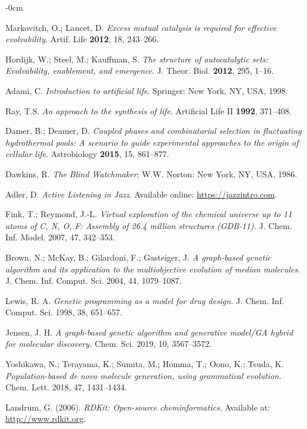 \documentclass[life,article,submit,pdftex,moreauthors]{Definitions/mdpi}
\begin{document}
\begin{adjustwidth}{-\extralength}{0cm}
{\begin{thebibliography}{999}
Markovitch, O.; Lancet, D. \textit{Excess mutual catalysis is required for effective evolvability}. Artif. Life \textbf{2012}, 18, 243--266.

Hordijk, W.; Steel, M.; Kauffman, S. \textit{The structure of autocatalytic sets: Evolvability, enablement, and emergence}. J. Theor. Biol. \textbf{2012}, 295, 1--16.

Adami, C. \textit{Introduction to artificial life}. Springer: New York, NY, USA, 1998.

Ray, T.S. \textit{An approach to the synthesis of life}. Artificial Life II \textbf{1992}, 371--408.

Damer, B.; Deamer, D. \textit{Coupled phases and combinatorial selection in fluctuating hydrothermal pools: A scenario to guide experimental approaches to the origin of cellular life}. Astrobiology \textbf{2015}, 15, 861--877.


Dawkins, R. \textit{The Blind Watchmaker}; W.W. Norton: New York, NY, USA, 1986.

Adler, D. \textit{Active Listening in Jazz}. Available online: \url{https://jazzintro.com}.

Fink, T.; Reymond, J.-L.
\textit{Virtual exploration of the chemical universe up to 11 atoms of C, N, O, F:
Assembly of 26.4 million structures (GDB-11).}
J. Chem. Inf. Model. 2007, 47, 342--353.

Brown, N.; McKay, B.; Gilardoni, F.; Gasteiger, J.
\textit{A graph-based genetic algorithm and its application to the multiobjective
evolution of median molecules.}
J. Chem. Inf. Comput. Sci. 2004, 44, 1079--1087.

Lewis, R. A.
\textit{Genetic programming as a model for drug design.}
J. Chem. Inf. Comput. Sci. 1998, 38, 651--657.

Jensen, J. H.
\textit{A graph-based genetic algorithm and generative model/GA hybrid for molecular discovery.}
Chem. Sci. 2019, 10, 3567--3572.

Yoshikawa, N.; Terayama, K.; Sumita, M.; Homma, T.; Oono, K.; Tsuda, K.
\textit{Population-based de novo molecule generation, using grammatical evolution.}
Chem. Lett. 2018, 47, 1431--1434.

Landrum, G. (2006). \textit{RDKit: Open-source cheminformatics}. Available at: \url{http://www.rdkit.org}.


\end{thebibliography}}
\end{adjustwidth}
\end{document}

